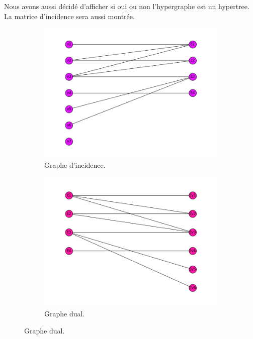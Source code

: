 \documentclass[a4papper]{article}
\begin{document}
			
			Nous avons aussi décidé d'afficher si oui ou non l'hypergraphe est un hypertree. La matrice d'incidence sera aussi montrée.
			

\begin{figure}[h!]
	\centering
	\begin{subfigure}[b]{0.45\linewidth}
		\includegraphics[width=\linewidth]{graphe_d'incidence.png}
  		\caption{Graphe d'incidence.}
	\end{subfigure}
	\begin{subfigure}[b]{0.45\linewidth}
		\includegraphics[width=\linewidth]{graphe_dual.png}
  		\caption{Graphe dual.}

\end{subfigure}
\end{figure}
\end{document}
